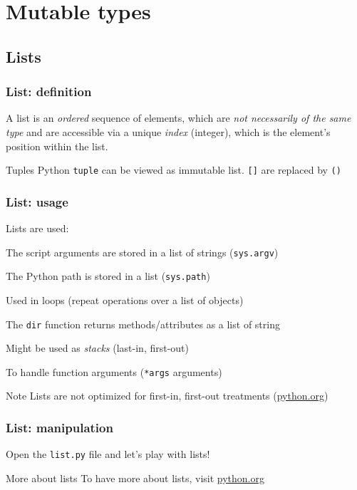 \section{Mutable types}
\subsection{Lists}

\begin{frame}[fragile]
    \frametitle{List: definition}
    A list is an \emph{ordered} sequence of elements, which are \emph{not necessarily of the same type} and are accessible via a unique \emph{index} (integer), which is the element's position within the list.
   
    \vspace{1em}
    

    \begin{block}{Tuples}
        Python \verb+tuple+ can be viewed as immutable list. \verb+[]+ are replaced by \verb+()+
    \end{block}

\end{frame}

\begin{frame}[fragile]
    \frametitle{List: usage}
    
    Lists are used: 
    \begin{itemize}
        \item{The script arguments are stored in a list of strings (\verb+sys.argv+)}
        \item{The Python path is stored in a list (\verb+sys.path+)}
        \item{Used in loops (repeat operations over a list of objects)}
        \item{The \verb+dir+ function returns methods/attributes as a list of string}
        \item{Might be used as \emph{stacks} (last-in, first-out)}
        \item{\item{To handle function arguments (\verb+*args+ arguments)}}
    \end{itemize}

    \begin{block}{Note}
        Lists are not optimized for first-in, first-out treatments (\href{https://docs.python.org/fr/3/tutorial/datastructures.html}{python.org})
    \end{block}
\end{frame}

\begin{frame}[fragile]
    \frametitle{List: manipulation}
    Open the \verb+list.py+ file and let's play with lists!

    \begin{block}{More about lists}
        To have more about lists, visit \href{https://docs.python.org/3/tutorial/datastructures.html#more-on-lists}{python.org}
    \end{block}

\end{frame}

